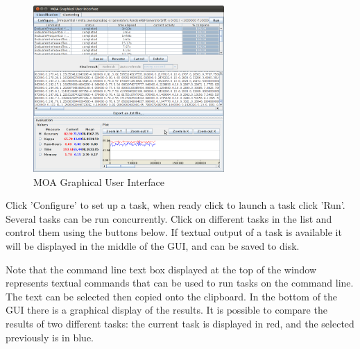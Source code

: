 \documentclass[a4paper,12pt]{article}
\begin{document}
\begin{figure}[h]
\begin{center} 
\includegraphics[height=2.5in]{images/MOA_Task.png}%
\end{center} 
\caption{MOA Graphical User Interface}
\label{fig:moagui}
\end{figure}

Click 'Configure' to set up a task, when ready click to launch a task click 'Run'. Several tasks can be run concurrently. 
Click on different tasks in the list and control them using the buttons below.
 If textual output of a task is available it will be displayed in the middle of the GUI, and can be saved to disk.

Note that the command line text box displayed at the top of the window represents textual commands that can be used to run tasks on the command line.
 The text can be selected then copied onto the clipboard. In the bottom of the GUI there is a graphical display of the results. It is possible
to compare the results of two different tasks: the current task is displayed in red, and the selected previously is in blue. 


\end{document}
